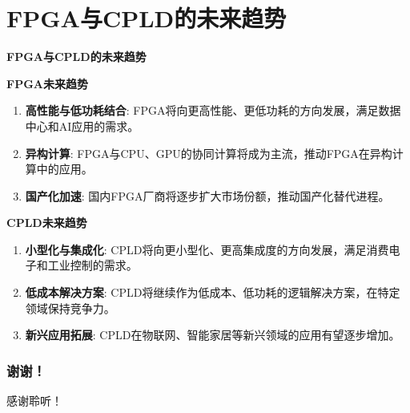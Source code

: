 \documentclass{beamer}
\providecommand{\tightlist}{%
  \setlength{\itemsep}{0pt}\setlength{\parskip}{0pt}}
\begin{document}
\section{FPGA与CPLD的未来趋势}
\begin{frame}[allowframebreaks]{\textbf{FPGA与CPLD的未来趋势}}
\begin{block}{\textbf{FPGA未来趋势}}
\begin{enumerate}
\tightlist
\item
    \textbf{高性能与低功耗结合}:
    FPGA将向更高性能、更低功耗的方向发展，满足数据中心和AI应用的需求。\\
\item
    \textbf{异构计算}:
    FPGA与CPU、GPU的协同计算将成为主流，推动FPGA在异构计算中的应用。\\
\item
    \textbf{国产化加速}:
    国内FPGA厂商将逐步扩大市场份额，推动国产化替代进程。
\end{enumerate}
\end{block}

\begin{block}{\textbf{CPLD未来趋势}}
\begin{enumerate}
\tightlist
\item
    \textbf{小型化与集成化}:
    CPLD将向更小型化、更高集成度的方向发展，满足消费电子和工业控制的需求。\\
\item
    \textbf{低成本解决方案}:
    CPLD将继续作为低成本、低功耗的逻辑解决方案，在特定领域保持竞争力。\\
\item
    \textbf{新兴应用拓展}:
    CPLD在物联网、智能家居等新兴领域的应用有望逐步增加。
\end{enumerate}
\end{block}
\end{frame}
        

\begin{frame}
\centering
\frametitle{谢谢！}
感谢聆听！
\end{frame}
\end{document}
